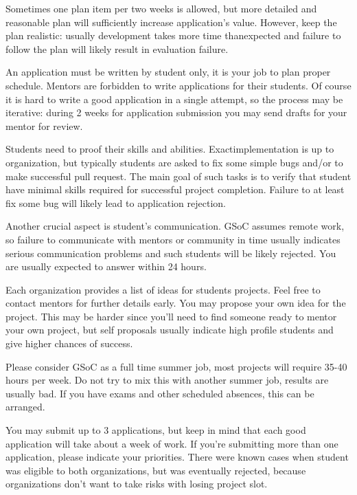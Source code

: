 \documentclass[10pt, a5paper]{article}
\begin{document}
Sometimes one plan item per two weeks is allowed, but more detailed and reasonable plan will sufficiently increase application's value. \linebreak However, keep the plan realistic: usually development takes more time than\linebreak expected and failure to follow the plan will likely result in evaluation failure. 

An application must be written by student only, it is your job to plan proper schedule. Mentors are forbidden to write applications for their students. Of course it is hard to write a good application in a single attempt, so the process may be iterative: during 2 weeks for application submission you may send drafts for your mentor for review.

Students need to proof their skills and abilities. Exact\linebreak implementation is up to organization, but typically students are asked to fix some simple bugs and/or to make successful pull request. The main goal of such tasks is to verify that student have minimal skills required for successful project completion. Failure to at least fix some bug will likely lead to application rejection.

Another crucial aspect is student's communication. GSoC assumes remote work, so failure to communicate with mentors or community in time usually indicates serious communication problems and such students will be likely rejected. You are usually expected to answer within 24 hours.

Each organization provides a list of ideas for students projects. Feel free to contact mentors for further details early. You may propose your own idea for the project. This may be harder since you'll need to find someone ready to mentor your own project, but self proposals usually indicate high profile students and give higher chances of success. 

Please consider GSoC as a full time summer job, most projects will require 35-40 hours per week. Do not try to mix this with another summer job, results are usually bad. If you have exams and other scheduled absences, this can be arranged.

You may submit up to 3 applications, but keep in mind that each good application will take about a week of work. If you're submitting more than one application, please indicate your priorities. There were known cases when student was eligible to both organizations, but was eventually rejected, because organizations don't want to take risks with losing project slot. 
\end{document}
